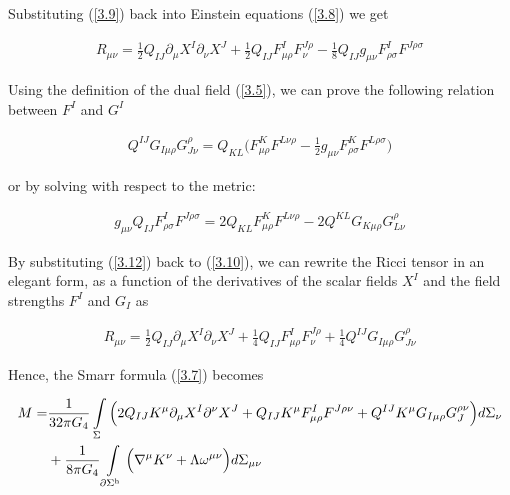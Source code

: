 \documentclass[a4paper,notitlepage]{report}
\begin{document}
\vspace{0.5em}
Substituting (\ref{3.9}) back into Einstein equations (\ref{3.8}) we get

\begin{align} \label{3.10}
R_{\mu\nu} = \frac{1}{2} Q_{IJ} \partial_{\mu} X^I \partial_{\nu} X^J + \frac{1}{2} Q_{IJ} F^I_{\mu\rho} F^{J\rho}_\nu - \frac{1}{8} Q_{IJ} g_{\mu\nu}  F^{I}_{\rho\sigma} F^{J\rho\sigma}
\end{align}

\vspace{0.5em}
Using the definition of the dual field (\ref{3.5}), we can prove the following relation between $F^I$ and $G^I$

\begin{align} \label{3.11}
Q^{IJ} G_{I\mu\rho} G_{J\nu}^\rho = Q_{KL} \Big(F^K_{\mu\rho} F^{L\nu\rho} - \frac{1}{2} g_{\mu\nu} F^K_{\rho\sigma} F^{L\rho\sigma} \Big)
\end{align}

\vspace{0.5em}
or by solving with respect to the metric:

\begin{align} \label{3.12}
g_{\mu\nu} Q_{IJ} F^I_{\rho\sigma} F^{J\rho\sigma} = 2 Q_{KL} F^K_{\mu\rho} F^{L\nu\rho} - 2 Q^{KL} G_{K\mu\rho} G_{L\nu}^\rho 
\end{align}

\vspace{0.5em}
By substituting (\ref{3.12}) back to (\ref{3.10}), we can rewrite the Ricci tensor in an elegant form, as a function of the derivatives of the scalar fields $X^I$ and the field strengths $F^I$ and $G_I$ as

\begin{align} \label{3.13}
R_{\mu\nu} = \frac{1}{2} Q_{IJ} \partial_{\mu} X^I \partial_{\nu} X^J + \frac{1}{4} Q_{IJ} F^I_{\mu\rho} F^{J\rho}_\nu + \frac{1}{4} Q^{IJ} G_{I\mu\rho} G^\rho_{J\nu}
\end{align}

\vspace{0.5 em}
Hence, the Smarr formula (\ref{3.7}) becomes

\begin{align} \label{3.14}
M =& \frac{1}{32\pi G_{4}} \int\limits_{\Sigma} \Big(2 Q_{IJ} K^\mu \partial_{\mu} X^I \partial^{\nu} X^J + Q_{IJ} K^\mu F^I_{\mu\rho} F^{J\rho\nu} + Q^{IJ} K^\mu G_{I\mu\rho} G^{\rho\nu}_{J} \Big) d\Sigma_\nu \notag\\
&+ \frac{1}{8\pi G_{4}} \int\limits_{\partial \Sigma^{\text{h}}} \Big( \nabla^{\mu} K^{\nu} + \Lambda \omega^{\mu\nu} \Big) d\Sigma_{\mu\nu}
\end{align}
\end{document}
